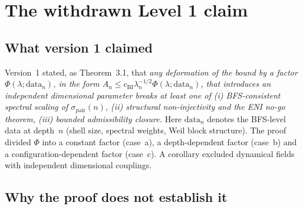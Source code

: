 \documentclass[11pt,a4paper]{article}
\begin{document}
  \section{The withdrawn Level 1 claim}
  \label{sec:withdrawn}

  \subsection{What version 1 claimed}

    Version~1 stated, as Theorem~3.1, that
    \emph{any deformation of the bound by a factor $\Phi(\lambda;\mathrm{data}_n)$, in the form
    $A_n\le c_{\mathrm{BI}}\lambda_n^{-1/2}\Phi(\lambda;\mathrm{data}_n)$, that introduces an independent dimensional parameter breaks at least one of
    (i) BFS-consistent spectral scaling of $\sigma_{\mathrm{pair}}(n)$, (ii) structural non-injectivity and the
    ENI no-go theorem, (iii) bounded admissibility closure.}
    Here $\mathrm{data}_n$ denotes the BFS-level data at depth~$n$ (shell size, spectral weights, Weil block
    structure).
    The proof divided $\Phi$ into a constant factor (case~a), a depth-dependent factor (case~b) and a
    configuration-dependent factor (case~c).
    A corollary excluded dynamical fields with independent dimensional couplings.

  \subsection{Why the proof does not establish it}
\end{document}
